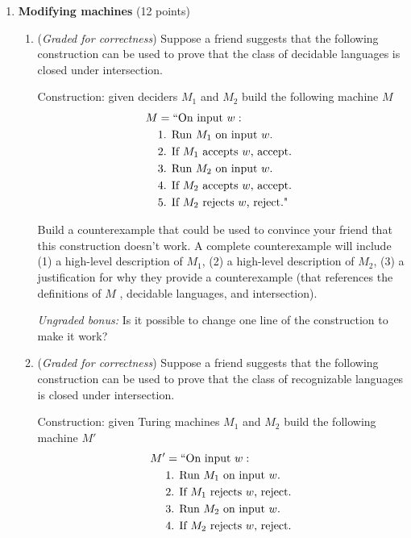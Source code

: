 \documentclass[12pt, oneside]{article}
\newcommand{\gradeCorrect}{({\it Graded for correctness}) }
\begin{document}
\begin{enumerate}[wide, labelwidth=!, labelindent=0pt]
\item\textbf{Modifying machines} (12 points)

\begin{enumerate}
\item\gradeCorrect
Suppose a friend suggests that the following construction can be used
to prove that the class of decidable languages is closed under intersection.

Construction: given deciders $M_1$ and $M_2$ build the following machine $M$
\begin{align*}
    M &= ``\text{On input }w:\\
     &\text{1. Run $M_1$ on input $w$.}\\
     &\text{2. If $M_1$ accepts $w$, accept. } \\
     &\text{3. Run $M_2$ on input $w$.} \\
     &\text{4. If $M_2$ accepts $w$, accept.}\\
     &\text{5. If $M_2$ rejects $w$, reject."}\\
 \end{align*}

 Build a counterexample that could be used to convince your friend that this 
 construction doesn't work. A complete counterexample will include (1) a high-level description of $M_1$, (2) a high-level description of $M_2$, (3) a justification for why they provide a counterexample (that references
 the definitions of $M$ , decidable languages, and intersection).

 {\it Ungraded bonus:} Is it possible to change one line of the construction to make it work?

 \item\gradeCorrect
 Suppose a friend suggests that the following construction can be used
 to prove that the class of recognizable languages is closed under intersection.
 
 Construction: given Turing machines $M_1$ and $M_2$ build the following machine $M'$
\begin{align*}
    M' &= ``\text{On input }w:\\
     &\text{1. Run $M_1$ on input $w$.}\\
     &\text{2. If $M_1$ rejects $w$, reject.} \\
     &\text{3. Run $M_2$ on input $w$.} \\
     &\text{4. If $M_2$ rejects $w$, reject.}\\
 \end{align*}


\end{enumerate}
\end{enumerate}
\end{document}
